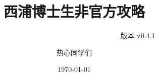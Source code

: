 \documentclass[lang=cn,12pt,newtx]{elegantbook}
\title{西浦博士生非官方攻略}
\subtitle{~~~~~~~~~~~~~~~~~~~~~~~~~~~~~~~~~~~~版本 v0.4.1}
\author{热心同学们}
\date{\today}
\begin{document}
\maketitle
\frontmatter


\tableofcontents
\mainmatter






% 



\backmatter	




\makeatletter
\makeatother
\end{document}
